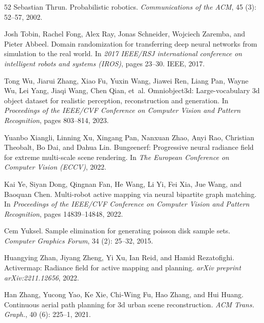 \documentclass[10pt,twocolumn,letterpaper]{article}
\begin{document}
{\begin{thebibliography}{52}
Sebastian Thrun.
\newblock Probabilistic robotics.
\newblock \emph{Communications of the ACM}, 45 (3): 52--57, 2002.

Josh Tobin, Rachel Fong, Alex Ray, Jonas Schneider, Wojciech Zaremba, and Pieter Abbeel.
\newblock Domain randomization for transferring deep neural networks from simulation to the real world.
\newblock In \emph{2017 IEEE/RSJ international conference on intelligent robots and systems (IROS)}, pages 23--30. IEEE, 2017.

Tong Wu, Jiarui Zhang, Xiao Fu, Yuxin Wang, Jiawei Ren, Liang Pan, Wayne Wu, Lei Yang, Jiaqi Wang, Chen Qian, et~al.
\newblock Omniobject3d: Large-vocabulary 3d object dataset for realistic perception, reconstruction and generation.
\newblock In \emph{Proceedings of the IEEE/CVF Conference on Computer Vision and Pattern Recognition}, pages 803--814, 2023.

Yuanbo Xiangli, Linning Xu, Xingang Pan, Nanxuan Zhao, Anyi Rao, Christian Theobalt, Bo Dai, and Dahua Lin.
\newblock Bungeenerf: Progressive neural radiance field for extreme multi-scale scene rendering.
\newblock In \emph{The European Conference on Computer Vision (ECCV)}, 2022.

Kai Ye, Siyan Dong, Qingnan Fan, He Wang, Li Yi, Fei Xia, Jue Wang, and Baoquan Chen.
\newblock Multi-robot active mapping via neural bipartite graph matching.
\newblock In \emph{Proceedings of the IEEE/CVF Conference on Computer Vision and Pattern Recognition}, pages 14839--14848, 2022.

Cem Yuksel.
\newblock Sample elimination for generating poisson disk sample sets.
\newblock \emph{Computer Graphics Forum}, 34 (2): 25--32, 2015.

Huangying Zhan, Jiyang Zheng, Yi Xu, Ian Reid, and Hamid Rezatofighi.
\newblock Activermap: Radiance field for active mapping and planning.
\newblock \emph{arXiv preprint arXiv:2211.12656}, 2022.

Han Zhang, Yucong Yao, Ke Xie, Chi-Wing Fu, Hao Zhang, and Hui Huang.
\newblock Continuous aerial path planning for 3d urban scene reconstruction.
\newblock \emph{ACM Trans. Graph.}, 40 (6): 225--1, 2021.


\end{thebibliography}}
\end{document}
